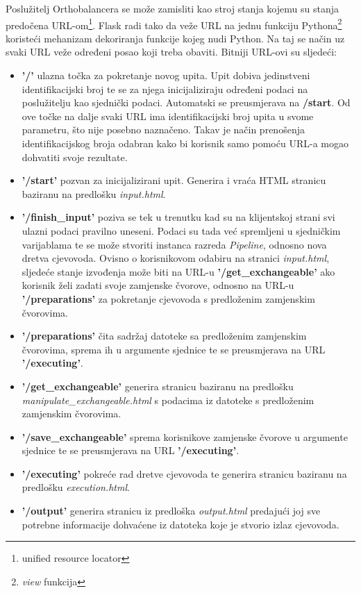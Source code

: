 Poslužitelj Orthobalancera se može zamisliti kao stroj stanja kojemu su stanja
predočena URL-om\footnote{unified resource locator}. Flask radi tako da veže
URL na jednu funkciju Pythona\footnote{\emph{view} funkcija} koristeći
mehanizam dekoriranja\cite{pep} funkcije kojeg nudi Python. Na taj se način uz
svaki URL veže određeni posao koji treba obaviti. Bitniji URL-ovi su sljedeći:

\begin{itemize}

    \item \textbf{'/'} ulazna točka za pokretanje novog upita. Upit dobiva
jedinstveni identifikacijski broj te se za njega inicijaliziraju određeni podaci
na poslužitelju kao sjednički podaci. Automatski se preusmjerava na
\textbf{/start}. Od ove točke na dalje svaki URL ima identifikacijski broj upita
u svome parametru, što nije posebno naznačeno. Takav je način prenošenja
identifikacijskog broja odabran kako bi korisnik samo pomoću URL-a mogao
dohvatiti svoje rezultate.

    \item \textbf{'/start'} pozvan za inicijalizirani upit. Generira i vraća
HTML stranicu baziranu na predlošku \emph{input.html}.

    \item \textbf{'/finish\_input'} poziva se tek u trenutku kad su na klijentskoj
strani svi ulazni podaci pravilno uneseni. Podaci su tada već spremljeni u
sjedničkim varijablama te se može stvoriti instanca razreda \emph{Pipeline},
odnosno nova dretva cjevovoda. Ovisno o korisnikovom odabiru na stranici
\emph{input.html}, sljedeće stanje izvođenja može biti na URL-u
\textbf{'/get\_exchangeable'} ako korisnik želi zadati svoje zamjenske čvorove,
odnosno na URL-u \textbf{'/preparations'} za pokretanje cjevovoda s predloženim
zamjenskim čvorovima.

    \item \textbf{'/preparations'} čita sadržaj datoteke sa predloženim
zamjenskim čvorovima, sprema ih u argumente sjednice te se preusmjerava na URL
\textbf{'/executing'}.

    \item \textbf{'/get\_exchangeable'} generira stranicu baziranu na predlošku
\emph{manipulate\_exchangeable.html} s podacima  iz datoteke s predloženim
zamjenskim čvorovima.

    \item \textbf{'/save\_exchangeable'} sprema korisnikove zamjenske čvorove u
argumente sjednice te se preusmjerava na URL \textbf{'/executing'}.

    \item \textbf{'/executing'} pokreće rad dretve cjevovoda te generira
stranicu baziranu na predlošku \emph{execution.html}.

    \item \textbf{'/output'} generira stranicu iz predloška \emph{output.html}
predajući joj sve potrebne informacije dohvaćene iz datoteka koje je stvorio
izlaz cjevovoda.

\end{itemize}

